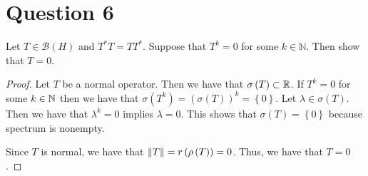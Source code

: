 \section{Question 6}
\horz

Let $T\in \mathcal B(H)$ and $T^*T=TT^*.$ Suppose that $T^k=0$ for some $k\in \mathbb N.$ Then show that $T=0.$

\horz

\begin{proof}
    Let $T$ be a normal operator. Then we have that $\sigma \left( T \right) \subset \mathbb R$. If $T^{k} = 0$ for some $k\in \mathbb N$ then we have that $\sigma\left( T^{k} \right)= \left( \sigma\left( T \right) \right)^{k} = \left\{ 0 \right\}$. Let $\lambda \in \sigma \left( T \right)$. Then we have that $\lambda ^{k} = 0$ implies $\lambda = 0$. This shows that $\sigma (T) = \left\{ 0 \right\}$ because spectrum is nonempty.

    Since $T$ is normal, we have that $\left\lVert T \right\rVert = r\left( \rho \left( T \right) \right)=0$. Thus, we have that $T=0$.
\end{proof}
